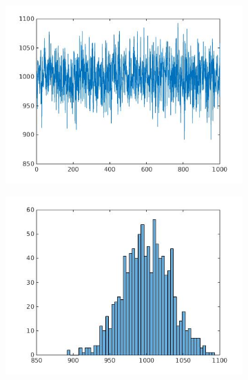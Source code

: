 \documentclass[]{article}
\begin{document}
  \vspace{-2mm}
  \begin{figure}[H]
    \centering
    \begin{subfigure}{.235\textwidth}
      \centering
      \includegraphics[width=1\linewidth]{noise1.jpg}
      \vspace{-6mm}
      \caption{}
    \end{subfigure}
    \begin{subfigure}{.235\textwidth}
      \centering
      \includegraphics[width=1\linewidth]{noisehist1.jpg}
      \vspace{-6mm}
      \caption{}
    \end{subfigure}
    \begin{subfigure}{.235\textwidth}

\end{subfigure}
\end{figure}
\end{document}
